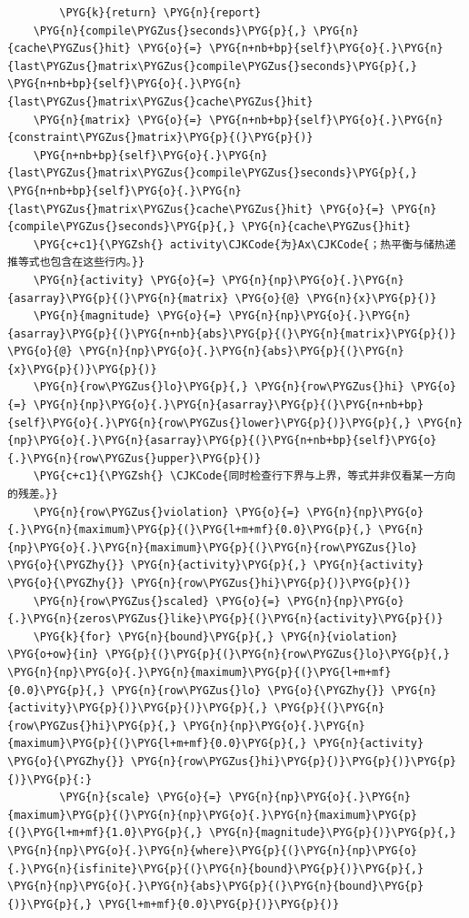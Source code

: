\begin{Verbatim}
        \PYG{k}{return} \PYG{n}{report}
    \PYG{n}{compile\PYGZus{}seconds}\PYG{p}{,} \PYG{n}{cache\PYGZus{}hit} \PYG{o}{=} \PYG{n+nb+bp}{self}\PYG{o}{.}\PYG{n}{last\PYGZus{}matrix\PYGZus{}compile\PYGZus{}seconds}\PYG{p}{,} \PYG{n+nb+bp}{self}\PYG{o}{.}\PYG{n}{last\PYGZus{}matrix\PYGZus{}cache\PYGZus{}hit}
    \PYG{n}{matrix} \PYG{o}{=} \PYG{n+nb+bp}{self}\PYG{o}{.}\PYG{n}{constraint\PYGZus{}matrix}\PYG{p}{(}\PYG{p}{)}
    \PYG{n+nb+bp}{self}\PYG{o}{.}\PYG{n}{last\PYGZus{}matrix\PYGZus{}compile\PYGZus{}seconds}\PYG{p}{,} \PYG{n+nb+bp}{self}\PYG{o}{.}\PYG{n}{last\PYGZus{}matrix\PYGZus{}cache\PYGZus{}hit} \PYG{o}{=} \PYG{n}{compile\PYGZus{}seconds}\PYG{p}{,} \PYG{n}{cache\PYGZus{}hit}
    \PYG{c+c1}{\PYGZsh{} activity\CJKCode{为}Ax\CJKCode{；热平衡与储热递推等式也包含在这些行内。}}
    \PYG{n}{activity} \PYG{o}{=} \PYG{n}{np}\PYG{o}{.}\PYG{n}{asarray}\PYG{p}{(}\PYG{n}{matrix} \PYG{o}{@} \PYG{n}{x}\PYG{p}{)}
    \PYG{n}{magnitude} \PYG{o}{=} \PYG{n}{np}\PYG{o}{.}\PYG{n}{asarray}\PYG{p}{(}\PYG{n+nb}{abs}\PYG{p}{(}\PYG{n}{matrix}\PYG{p}{)} \PYG{o}{@} \PYG{n}{np}\PYG{o}{.}\PYG{n}{abs}\PYG{p}{(}\PYG{n}{x}\PYG{p}{)}\PYG{p}{)}
    \PYG{n}{row\PYGZus{}lo}\PYG{p}{,} \PYG{n}{row\PYGZus{}hi} \PYG{o}{=} \PYG{n}{np}\PYG{o}{.}\PYG{n}{asarray}\PYG{p}{(}\PYG{n+nb+bp}{self}\PYG{o}{.}\PYG{n}{row\PYGZus{}lower}\PYG{p}{)}\PYG{p}{,} \PYG{n}{np}\PYG{o}{.}\PYG{n}{asarray}\PYG{p}{(}\PYG{n+nb+bp}{self}\PYG{o}{.}\PYG{n}{row\PYGZus{}upper}\PYG{p}{)}
    \PYG{c+c1}{\PYGZsh{} \CJKCode{同时检查行下界与上界，等式并非仅看某一方向的残差。}}
    \PYG{n}{row\PYGZus{}violation} \PYG{o}{=} \PYG{n}{np}\PYG{o}{.}\PYG{n}{maximum}\PYG{p}{(}\PYG{l+m+mf}{0.0}\PYG{p}{,} \PYG{n}{np}\PYG{o}{.}\PYG{n}{maximum}\PYG{p}{(}\PYG{n}{row\PYGZus{}lo} \PYG{o}{\PYGZhy{}} \PYG{n}{activity}\PYG{p}{,} \PYG{n}{activity} \PYG{o}{\PYGZhy{}} \PYG{n}{row\PYGZus{}hi}\PYG{p}{)}\PYG{p}{)}
    \PYG{n}{row\PYGZus{}scaled} \PYG{o}{=} \PYG{n}{np}\PYG{o}{.}\PYG{n}{zeros\PYGZus{}like}\PYG{p}{(}\PYG{n}{activity}\PYG{p}{)}
    \PYG{k}{for} \PYG{n}{bound}\PYG{p}{,} \PYG{n}{violation} \PYG{o+ow}{in} \PYG{p}{(}\PYG{p}{(}\PYG{n}{row\PYGZus{}lo}\PYG{p}{,} \PYG{n}{np}\PYG{o}{.}\PYG{n}{maximum}\PYG{p}{(}\PYG{l+m+mf}{0.0}\PYG{p}{,} \PYG{n}{row\PYGZus{}lo} \PYG{o}{\PYGZhy{}} \PYG{n}{activity}\PYG{p}{)}\PYG{p}{)}\PYG{p}{,} \PYG{p}{(}\PYG{n}{row\PYGZus{}hi}\PYG{p}{,} \PYG{n}{np}\PYG{o}{.}\PYG{n}{maximum}\PYG{p}{(}\PYG{l+m+mf}{0.0}\PYG{p}{,} \PYG{n}{activity} \PYG{o}{\PYGZhy{}} \PYG{n}{row\PYGZus{}hi}\PYG{p}{)}\PYG{p}{)}\PYG{p}{)}\PYG{p}{:}
        \PYG{n}{scale} \PYG{o}{=} \PYG{n}{np}\PYG{o}{.}\PYG{n}{maximum}\PYG{p}{(}\PYG{n}{np}\PYG{o}{.}\PYG{n}{maximum}\PYG{p}{(}\PYG{l+m+mf}{1.0}\PYG{p}{,} \PYG{n}{magnitude}\PYG{p}{)}\PYG{p}{,} \PYG{n}{np}\PYG{o}{.}\PYG{n}{where}\PYG{p}{(}\PYG{n}{np}\PYG{o}{.}\PYG{n}{isfinite}\PYG{p}{(}\PYG{n}{bound}\PYG{p}{)}\PYG{p}{,} \PYG{n}{np}\PYG{o}{.}\PYG{n}{abs}\PYG{p}{(}\PYG{n}{bound}\PYG{p}{)}\PYG{p}{,} \PYG{l+m+mf}{0.0}\PYG{p}{)}\PYG{p}{)}

\end{Verbatim}
